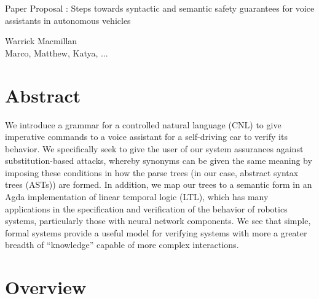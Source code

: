 \documentclass[a4paper, 11pt]{article}
\begin{document}

\begin{titlepage}

\vspace*{1cm}

\begin{center} \Large Paper Proposal : Steps towards syntactic and semantic
  safety guarantees for voice assistants in autonomous vehicles  \\ 


\vspace{1.5cm}

\large Warrick Macmillan  \\
\large Marco, Matthew, Katya, ... \end{center}

\end{titlepage}

\section{Abstract} 

We introduce a grammar for a controlled natural language (CNL) to give
imperative commands to a voice assistant for a self-driving car to 
verify its behavior. We specifically seek to give the user of our
system assurances against substitution-based attacks, whereby synonyms can be
given the same meaning by imposing these conditions in how the parse trees (in
our case, abstract syntax trees (ASTs)) are formed. In addition, we map our
trees to a semantic form in an Agda implementation of linear temporal logic
(LTL), which has many applications in the specification and verification of the
behavior of robotics systems, particularly those with neural network components.
We see that simple, formal systems provide a useful model for verifying systems
with more a greater breadth of ``knowledge'' capable of more complex
interactions.

\section{Overview}
\end{document}
